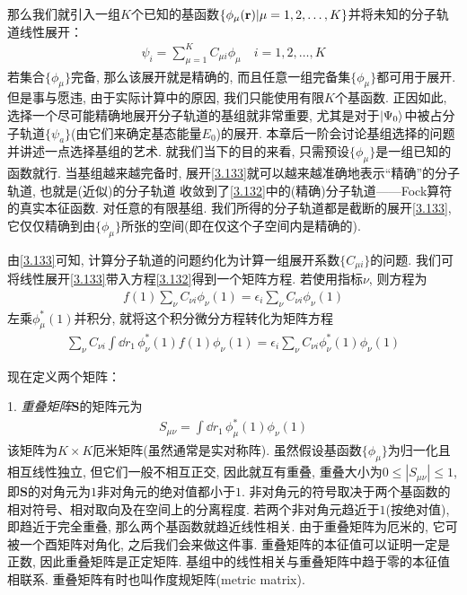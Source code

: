 那么我们就引入一组$K$个已知的基函数$\{\phi_\mu(\mathbf{r})|\mu=1,2,\ldots,K\}$并将未知的分子轨道线性展开：
\begin{align}
	\label{3.133}
	\psi_i = \sum_{\mu=1}^{K}C_{\mu i}\phi_\mu\quad i = 1,2,\ldots,K
\end{align}
若集合$\{\phi_\mu\}$完备, 
那么该展开就是精确的, 
而且任意一组完备集$\{\phi_\mu\}$都可用于展开. 
但是事与愿违, 
由于实际计算中的原因, 
我们只能使用有限$K$个基函数. 
正因如此, 
选择一个尽可能精确地展开分子轨道的基组就非常重要, 
尤其是对于$\Ket{\Psi_0}$中被占分子轨道$\{\psi_a\}$(由它们来确定基态能量$E_0$)的展开. 
本章后一阶会讨论基组选择的问题并讲述一点选择基组的艺术. 
就我们当下的目的来看, 
只需预设$\{\phi_\mu\}$是一组已知的函数就行. 
当基组越来越完备时, 
展开\autoref{3.133}就可以越来越准确地表示“精确”的分子轨道, 
也就是(近似)的分子轨道 收敛到了\autoref{3.132}中的(精确)分子轨道——Fock算符的真实本征函数. 
对任意的有限基组. 
我们所得的分子轨道都是截断的展开\autoref{3.133}, 
它仅仅精确到由$\{\phi_\mu\}$所张的空间(即在仅这个子空间内是精确的).


由\autoref{3.133}可知, 
计算\hft 分子轨道的问题约化为计算一组展开系数$\{C_{\mu i} \}$的问题. 
我们可将线性展开\autoref{3.133}带入\hft 方程\autoref{3.132}得到一个矩阵方程. 
若使用指标$\nu$, 
则方程为
\begin{align}
	f(1) \sum_\nu C_{\nu i}\phi_\nu(1) = \epsilon_i\sum_\nu C_{\nu i}\phi_\nu(1) 
\end{align}
左乘$\phi_\mu^*(1)$并积分, 
就将这个积分微分方程转化为矩阵方程
\begin{align}
	\label{3.135}
	\sum_\nu C_{\nu i}\int\dd{r}_1\,\phi_\nu^*(1)f(1)\phi_\nu(1) = \epsilon_i\sum_\nu C_{\nu i}\phi_\nu^*(1)\phi_\nu(1)
\end{align}

现在定义两个矩阵：

1. \emph{重叠矩阵$\mathbf{S}$}的矩阵元为
\begin{align}
	S_{\mu\nu}=\int\dd{r}_1\,\phi_\mu^*(1)\phi_\nu(1)
\end{align}
该矩阵为$K\times K$厄米矩阵(虽然通常是实对称阵). 
虽然假设基函数$\{\phi_\mu\}$为归一化且相互线性独立, 
但它们一般不相互正交, 
因此就互有重叠, 
重叠大小为$0\leqslant|S_{\mu\nu}|\leqslant1$, 
即$\mathbf{S}$的对角元为$1$非对角元的绝对值都小于$1$. 
非对角元的符号取决于两个基函数的相对符号、相对取向及在空间上的分离程度. 
若两个非对角元趋近于$1$(按绝对值), 
即趋近于完全重叠, 
那么两个基函数就趋近线性相关. 
由于重叠矩阵为厄米的, 
它可被一个酉矩阵对角化, 
之后我们会来做这件事. 
重叠矩阵的本征值可以证明一定是正数, 
因此重叠矩阵是正定矩阵. 
基组中的线性相关与重叠矩阵中趋于零的本征值相联系. 
重叠矩阵有时也叫作度规矩阵(metric matrix). 


